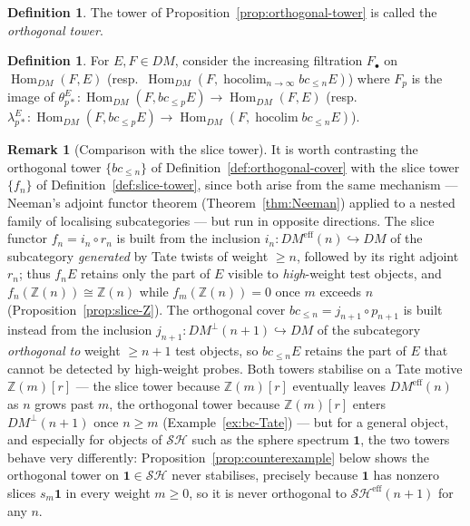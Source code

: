 \documentclass[12pt,a4paper]{article}
\theoremstyle{definition}
\newtheorem{definition}[theorem]{Definition}
\newtheorem{remark}[theorem]{Remark}
\newcommand{\SH}{\mathcal{SH}}
\newcommand{\hocolim}{\operatorname*{hocolim}}
\newcommand{\Hom}{\operatorname{Hom}}
\newcommand{\Z}{\mathbb{Z}}
\begin{document}
\begin{definition}\label{def:orthogonal-tower}
The tower of Proposition~\ref{prop:orthogonal-tower} is called the
\emph{orthogonal tower}.
\end{definition}

\begin{definition}\label{def:filtration-F}
For $E,F\in DM$, consider the increasing filtration $F_\bullet$ on
$\Hom_{DM}(F,E)$ (resp.\ $\Hom_{DM}(F,\hocolim_{n\to\infty}bc_{\leq n}E)$)
where $F_p$ is the image of
$\theta_{p*}^E:\Hom_{DM}(F,bc_{\leq p}E)\to\Hom_{DM}(F,E)$
(resp.\ $\lambda_{p*}^E:\Hom_{DM}(F,bc_{\leq p}E)\to\Hom_{DM}(F,\hocolim bc_{\leq n}E)$).
\end{definition}

\begin{remark}[Comparison with the slice tower]\label{rem:orthogonal-vs-slice}
It is worth contrasting the orthogonal tower $\{bc_{\leq n}\}$ of
Definition~\ref{def:orthogonal-cover} with the slice tower $\{f_n\}$ of
Definition~\ref{def:slice-tower}, since both arise from the same mechanism —
Neeman's adjoint functor theorem (Theorem~\ref{thm:Neeman}) applied to a nested
family of localising subcategories — but run in opposite directions.  The slice
functor $f_n=i_n\circ r_n$ is built from the inclusion
$i_n:DM^{\mathrm{eff}}(n)\hookrightarrow DM$ of the subcategory \emph{generated}
by Tate twists of weight $\geq n$, followed by its right adjoint $r_n$; thus
$f_nE$ retains only the part of $E$ visible to \emph{high}-weight test objects,
and $f_n(\Z(n))\cong\Z(n)$ while $f_m(\Z(n))=0$ once $m$ exceeds $n$
(Proposition~\ref{prop:slice-Z}).  The orthogonal cover
$bc_{\leq n}=j_{n+1}\circ p_{n+1}$ is built instead from the inclusion
$j_{n+1}:DM^\perp(n+1)\hookrightarrow DM$ of the subcategory \emph{orthogonal to}
weight $\geq n+1$ test objects, so $bc_{\leq n}E$ retains the part of $E$ that
cannot be detected by high-weight probes.  Both towers stabilise on a Tate motive
$\Z(m)[r]$ — the slice tower because $\Z(m)[r]$ eventually leaves
$DM^{\mathrm{eff}}(n)$ as $n$ grows past $m$, the orthogonal tower because
$\Z(m)[r]$ enters $DM^\perp(n+1)$ once $n\geq m$
(Example~\ref{ex:bc-Tate}) — but for a general object, and especially for
objects of $\SH$ such as the sphere spectrum $\mathbf 1$, the two towers behave
very differently: Proposition~\ref{prop:counterexample} below shows the
orthogonal tower on $\mathbf 1\in\SH$ never stabilises, precisely because
$\mathbf 1$ has nonzero slices $s_m\mathbf 1$ in every weight $m\geq 0$, so it is
never orthogonal to $\SH^{\mathrm{eff}}(n+1)$ for any $n$.
\end{remark}
\end{document}
